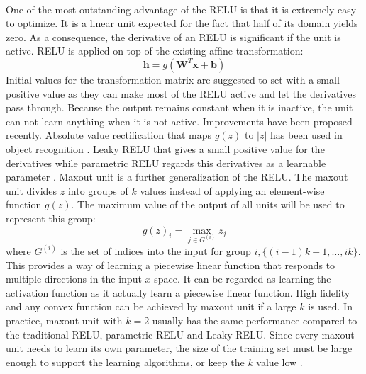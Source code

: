 \paragraph{}
One of the most outstanding advantage of the RELU is that it is extremely easy to optimize.
It is a linear unit expected for the fact that half of its domain yields zero.
As a consequence, the derivative of an RELU is significant if the unit is active.
RELU is applied on top of the existing affine transformation:
\begin{equation}
    \mathbf{h} = g( \mathbf{W}^T \mathbf{x} + \mathbf{b})
\end{equation}
%
Initial values for the transformation matrix are suggested to set with a small positive value as they can make most of the RELU active and let the derivatives pass through.
Because the output remains constant when it is inactive, the unit can not learn anything when it is not active.
Improvements have been proposed recently.
Absolute value rectification that maps $g(z)$ to $|z|$ has been used in object recognition \citep{jarret2009}.
Leaky RELU that gives a small positive value for the derivatives \citep{maas2013} while parametric RELU regards this derivatives as a learnable parameter \citep{He2015}.
Maxout unit \citep{Goodfellow2013} is a further generalization of the RELU.
The maxout unit divides $z$ into groups of $k$ values instead of applying an element-wise function $g(z)$.
The maximum value of the output of all units will be used to represent this group:
\begin{equation}
    g(z)_i = \max_{j\in G^{(i)}} z_j
\end{equation}
%
where $G^{(i)}$ is the set of indices into the input for group $i, \{(i-1)k+1, \dots, ik \}$.
This provides a way of learning a piecewise linear function that responds to multiple directions in the input $x$ space.
It can be regarded as learning the activation function as it actually learn a piecewise linear function.
High fidelity and any convex function can be achieved by maxout unit if a large $k$ is used.
In practice, maxout unit with $k=2$ usually has the same performance compared to the traditional RELU, parametric RELU and Leaky RELU.
Since every maxout unit needs to learn its own parameter, the size of the training set must be large enough to support the learning algorithms, or keep the $k$ value low \citep{Cai2013}.





